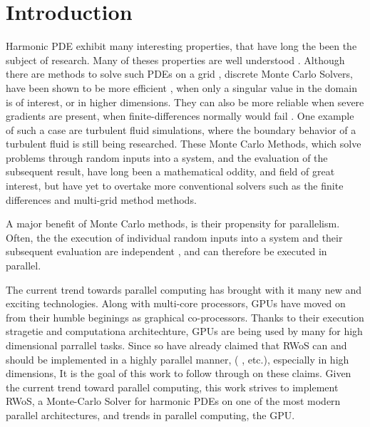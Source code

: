 
\chapter{Introduction}
\label{chapter:Introduction}


Harmonic \Gls{PDE} exhibit many interesting properties, that
have long the been the subject of research.  Many of theses properties are well
understood \cite{Axler1992,Sheldon}.  Although there are methods to solve such
\Glspl{PDE} on a grid \cite{Bornemann}, discrete Monte Carlo Solvers, have been shown
to be more efficient \cite{Bornemann, DeLaurentis, kakutani1944}, when only a
singular value in the domain is of interest, or in higher dimensions. They can also
be more reliable when severe gradients are present,
when finite-differences normally would fail \cite{DeLaurentis}. One example of such a case are
 turbulent fluid simulations, where the boundary behavior of a turbulent
fluid is still being researched.  These Monte Carlo Methods, which solve problems
through random inputs into a system, and the evaluation of the subsequent result,
have long been a mathematical oddity, and field of great interest, but have yet
to overtake more conventional solvers such as the finite differences and multi-grid method
methods.
\par
A major benefit of Monte Carlo methods, is their propensity for parallelism.  Often,
the the execution of individual random inputs into a system  and their subsequent evaluation
are independent
, and can therefore be executed in parallel.

The current trend towards parallel computing has brought with it many new and exciting
technologies.  Along with multi-core processors, \Glspl{GPU} have moved on from
their humble beginings as graphical co-processors.  Thanks to their execution
stragetie and computationa architechture, \Glspl{GPU} are being used by many for
high dimensional parrallel tasks. Since so have already
claimed that \Gls{RWoS} can and should be implemented in a highly parallel manner,
( \cite{DeLaurentis,Sabelfeld}, etc.), especially in high dimensions,  It is the goal
 of this work to follow through on these claims.  Given the
current trend toward parallel computing, this work strives to implement
\Gls{RWoS}, a Monte-Carlo Solver for harmonic \Glspl{PDE} on one of the most modern
parallel architectures, and trends in parallel computing, the \Gls{GPU}.
\par




